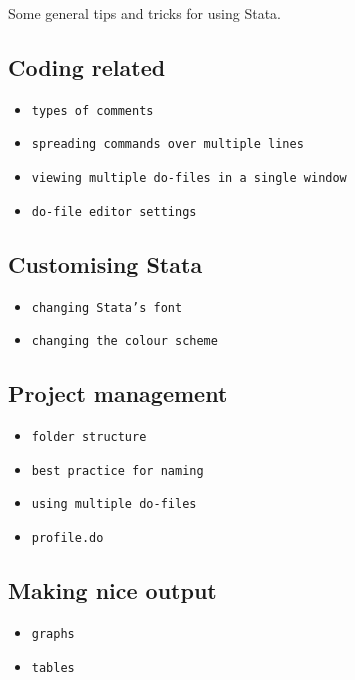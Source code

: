 Some general tips and tricks for using Stata.

\subsection{Coding related}

\begin{itemize}
    \item \texttt{types of comments}
    \item \texttt{spreading commands over multiple lines}
    \item \texttt{viewing multiple do-files in a single window}
    \item \texttt{do-file editor settings}
\end{itemize}

\subsection{Customising Stata}

\begin{itemize}
    \item \texttt{changing Stata's font}
    \item \texttt{changing the colour scheme}
\end{itemize}

\subsection{Project management}

\begin{itemize}
    \item \texttt{folder structure}
    \item \texttt{best practice for naming}
    \item \texttt{using multiple do-files}
    \item \texttt{profile.do}
\end{itemize}

\subsection{Making nice output}

\begin{itemize}
    \item \texttt{graphs}
    \item \texttt{tables}
\end{itemize}
